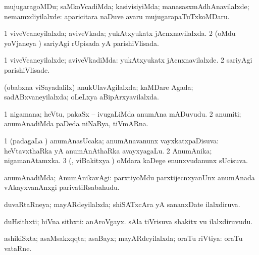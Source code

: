 \noindent
\gl{\nuga}
\bmng
{}  mujugaragoMDu; saMkoVcadiMda; kasivisiyiMda; manasasxmAdhAnavilalxde; nemamxdiyilalxde:  aparicitara naDuve avaru mujugarapaTuTxkoMDaru. 
\emng
\eentry

\bentry
{}
\gl{\saMkiSx}
\bmng
{} 
\emng
\eentry

\bentry
{}
\gl{\gu}
\bmng
\bnum
\num{1} viveVcaneyilalxda; aviveVkada; yukAtxyukatx jAcnxnavilalxda. 
\num{2} (oMdu yoVjaneya \vi) sariyAgi rUpisada yA parishiVlisada. 
\enum
\emng
\eentry

\bentry
{}
\gl{\kirxvi}
\bmng
\bnum
\num{1} viveVcaneyilalxde; aviveVkadiMda: yukAtxyukatx jAcnxnavilalxde. 
\num{2} sariyAgi parishiVlisade. 
\enum
\emng
\eentry

\bentry
{}
\gl{\gu}
\bmng
(obabxna viSayadalilx) anukUlavAgilalxda; kaMDare Agada; sadABxvaneyilalxda; oLeLxya aBipArxyavilalxda. 
\emng
\eentry

\bentry
{}
\gl{\nA}
\bmng
\bnum
\num{1} nigamana; heVtu, pakaSx -- ivugaLiMda anumAna mADuvudu. 
\num{2} anumiti; anumAnadiMda paDeda niNaRya, tiVmARna. 
\enum
\emng
\eentry

\bentry
{}
\gl{\gu}
\bmng
\bnum
\num{1} (padagaLa \vi) anumAnasUcaka; anumAnavanunx vayxkatxpaDisuva:  heVtavxthaRka yA anumAnAthaRka avayxyagaLu. 
\num{2} AnumAnika; nigamanAtamxka. 
\num{3} (\vAyx, viBakitxya \vi) oMdara kaDege enunxvudanunx sUcisuva. 
\enum
\emng
\eentry

\bentry
{}
\gl{\kirxvi}
\bmng
anumAnadiMda; AnumAnikavAgi:  parxtiyoMdu parxtijecnxyanUnx anumAnada vAkayxvanAnxgi parivatiRsabahudu. 
\emng
\eentry

\bentry
{}
\gl{\gu}
\bmng
duvaRtaRneya; mayARdeyilalxda; shiSATxcAra yA sananxDate ilalxdiruva. 
\emng
\eentry

\bentry
{}
\gl{\nA}
\bmng
duHsithxti; hiVna sithxti: 
\banum
{} anAroVgayx. 
 sAla tiVrisuva shakitx \mo vu ilalxdiruvudu. 
\eanum
\emng
\eentry

\bentry
{}
\gl{\gu}
\bmng
ashikiSxta; asaMsakxqqta; asaBayx; mayARdeyilalxda; oraTu riVtiya:  oraTu vataRne. 
\emng
\eentry

